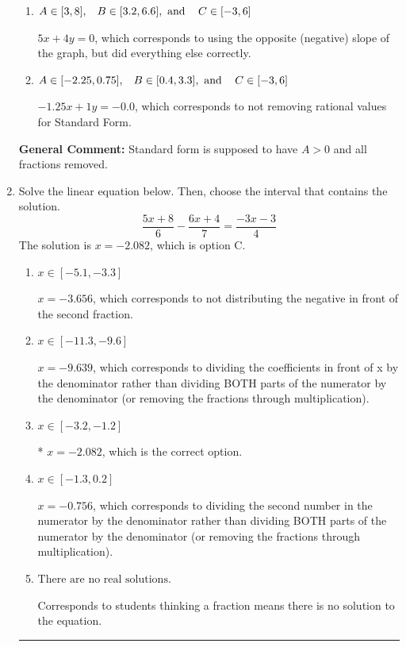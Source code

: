 \documentclass{extbook}[14pt]
\newcommand{\litem}[1]{\item #1

\rule{\textwidth}{0.4pt}}
\begin{document}
\begin{enumerate}
{\begin{enumerate}[label=\Alph*.]
 $-1.25x - 1y = 0.0$, which corresponds to using the opposite (negative) slope of the graph and not removing rational values.
\item \( A \in [3, 8], \hspace{3mm} B \in [3.2, 6.6], \text{ and } \hspace{3mm} C \in [-3, 6] \)

 $5x + 4y = 0$, which corresponds to using the opposite (negative) slope of the graph, but did everything else correctly.
\item \( A \in [-2.25, 0.75], \hspace{3mm} B \in [0.4, 3.3], \text{ and } \hspace{3mm} C \in [-3, 6] \)

 $-1.25x + 1y = -0.0$, which corresponds to not removing rational values for Standard Form.
\end{enumerate}

\textbf{General Comment:} Standard form is supposed to have $A > 0$ and all fractions removed.
}
\litem{
Solve the linear equation below. Then, choose the interval that contains the solution.
\[ \frac{5x + 8}{6} - \frac{6x + 4}{7} = \frac{-3x -3}{4} \]The solution is \( x = -2.082 \), which is option C.\begin{enumerate}[label=\Alph*.]
\item \( x \in [-5.1, -3.3] \)

 $x = -3.656$, which corresponds to not distributing the negative in front of the second fraction.
\item \( x \in [-11.3, -9.6] \)

 $x = -9.639$, which corresponds to dividing the coefficients in front of x by the denominator rather than dividing BOTH parts of the numerator by the denominator (or removing the fractions through multiplication).
\item \( x \in [-3.2, -1.2] \)

* $x = -2.082$, which is the correct option.
\item \( x \in [-1.3, 0.2] \)

 $x = -0.756$, which corresponds to dividing the second number in the numerator by the denominator rather than dividing BOTH parts of the numerator by the denominator (or removing the fractions through multiplication).
\item \( \text{There are no real solutions.} \)

Corresponds to students thinking a fraction means there is no solution to the equation.
\end{enumerate}

}
\end{enumerate}
\end{document}
